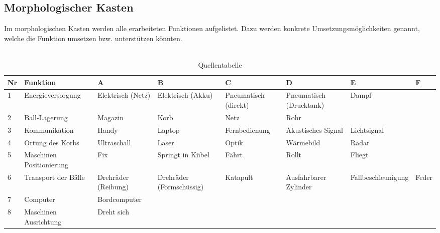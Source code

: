 \begin{landscape}
\section{Morphologischer Kasten}
Im morphologischen Kasten werden alle erarbeiteten Funktionen aufgelistet. Dazu werden konkrete Umsetzungsmöglichkeiten genannt, welche die Funktion umsetzen bzw. unterstützen könnten.\\
\\

\begin{table}[h!]
	\centering
	\begin{tabular}{l l l l l l l l}
		Nr & Funktion & A & B & C & D & E & F \\
		\hline
		
		1 & Energieversorgung & Elektrisch (Netz) & Elektrisch (Akku) & Pneumatisch (direkt) & Pneumatisch (Drucktank) & Dampf & \\
		
		2 & Ball-Lagerung & Magazin & Korb & Netz & Rohr & & \\
		
		3 & Kommunikation & Handy & Laptop & Fernbedienung & Akustisches Signal & Lichtsignal & \\
		
		4 & Ortung des Korbs & Ultraschall & Laser & Optik & Wärmebild & Radar & \\
		
		5 & Maschinen Positionierung & Fix & Springt in Kübel & Fährt & Rollt & Fliegt & \\
		
		6 & Transport der Bälle & Drehräder (Reibung) & Drehräder (Formschüssig) & Katapult & Ausfahrbarer Zylinder & Fallbeschleunigung & Feder \\
		
		7 & Computer & Bordcomputer & & & & & \\
		
		8 & Maschinen Ausrichtung & Dreht sich & & & & & \\
		
	\end{tabular}
	\caption{Quellentabelle}
	\label{tab:quelle}
\end{table}
\end{landscape}